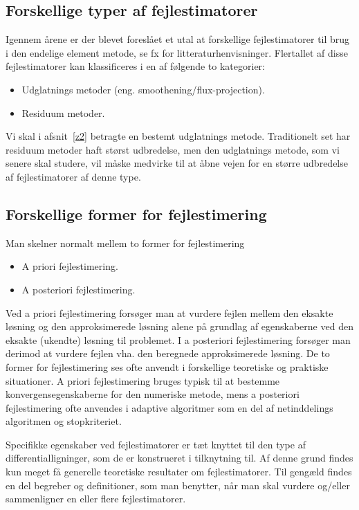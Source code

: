 \subsection{Forskellige typer af fejlestimatorer}
Igennem årene er der blevet foreslået et utal at forskellige
fejlestimatorer til brug i den endelige element metode, se fx
\cite{babuska1} for
litteraturhenvisninger. Flertallet af disse fejlestimatorer kan
klassificeres i en af følgende to kategorier:
\begin{itemize}
  \item Udglatnings metoder (eng. smoothening/flux-projection).
  \item Residuum metoder.
\end{itemize}
Vi skal i afsnit~\ref{z2} betragte en bestemt udglatnings metode.
Traditionelt set har residuum metoder haft størst udbredelse, men den
udglatnings metode, som vi senere skal studere, vil måske medvirke til at åbne
vejen for en større udbredelse af fejlestimatorer af denne type.

\subsection{Forskellige former for fejlestimering}
Man skelner normalt mellem to former for fejlestimering
\begin{itemize}
  \item A priori fejlestimering.
  \item A posteriori fejlestimering.
\end{itemize}
Ved a priori fejlestimering forsøger man at vurdere fejlen mellem den
eksakte løsning og den approksimerede løsning alene på grundlag af
egenskaberne ved den eksakte (ukendte) løsning til problemet. I a
posteriori fejlestimering forsøger man derimod at vurdere fejlen vha.
den beregnede approksimerede løsning. De to former for fejlestimering
ses ofte anvendt i forskellige teoretiske og praktiske situationer. A
priori fejlestimering bruges typisk til at bestemme
konvergensegenskaberne for den numeriske metode, mens a posteriori
fejlestimering ofte anvendes i adaptive algoritmer som en del af
netinddelings algoritmen og stopkriteriet.

Specifikke egenskaber ved fejlestimatorer er tæt knyttet til den
type af differentialligninger, som de er konstrueret i tilknytning til.
Af denne grund findes kun  meget få generelle teoretiske resultater om
fejlestimatorer. Til gengæld findes en del begreber og definitioner,
som man benytter, når man skal vurdere og/eller sammenligner en eller
flere fejlestimatorer.

